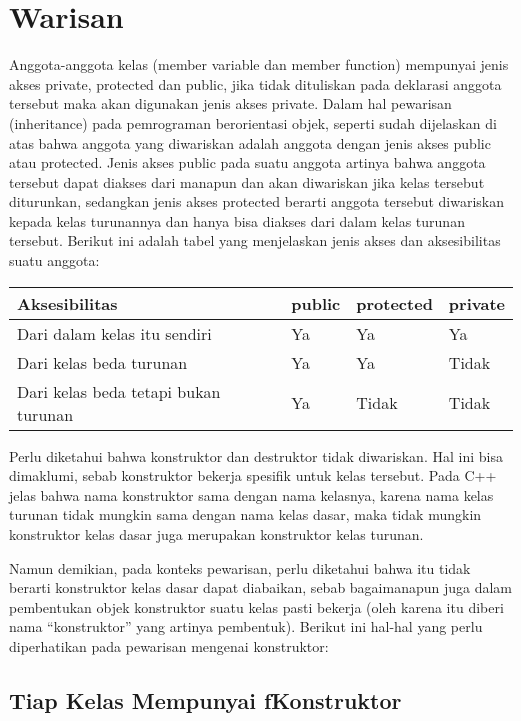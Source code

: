 \section{Warisan}\label{warisan}

Anggota-anggota kelas (member variable dan member function) mempunyai
jenis akses private, protected dan public, jika tidak dituliskan pada
deklarasi anggota tersebut maka akan digunakan jenis akses private.
Dalam hal pewarisan (inheritance) pada pemrograman berorientasi objek,
seperti sudah dijelaskan di atas bahwa anggota yang diwariskan adalah
anggota dengan jenis akses public atau protected. Jenis akses public
pada suatu anggota artinya bahwa anggota tersebut dapat diakses dari
manapun dan akan diwariskan jika kelas tersebut diturunkan, sedangkan
jenis akses protected berarti anggota tersebut diwariskan kepada kelas
turunannya dan hanya bisa diakses dari dalam kelas turunan tersebut.
Berikut ini adalah tabel yang menjelaskan jenis akses dan aksesibilitas
suatu anggota:

\begin{longtable}[]{@{}llll@{}}
\toprule
Aksesibilitas & public & protected & private\tabularnewline
\midrule
\endhead
Dari dalam kelas itu sendiri & Ya & Ya & Ya\tabularnewline
Dari kelas beda turunan & Ya & Ya & Tidak\tabularnewline
Dari kelas beda tetapi bukan turunan & Ya & Tidak & Tidak\tabularnewline
\bottomrule
\end{longtable}

Perlu diketahui bahwa konstruktor dan destruktor tidak diwariskan. Hal
ini bisa dimaklumi, sebab konstruktor bekerja spesifik untuk kelas
tersebut. Pada C++ jelas bahwa nama konstruktor sama dengan nama
kelasnya, karena nama kelas turunan tidak mungkin sama dengan nama kelas
dasar, maka tidak mungkin konstruktor kelas dasar juga merupakan
konstruktor kelas turunan.

Namun demikian, pada konteks pewarisan, perlu diketahui bahwa itu tidak
berarti konstruktor kelas dasar dapat diabaikan, sebab bagaimanapun juga
dalam pembentukan objek konstruktor suatu kelas pasti bekerja (oleh
karena itu diberi nama ``konstruktor'' yang artinya pembentuk). Berikut
ini hal-hal yang perlu diperhatikan pada pewarisan mengenai konstruktor:

\subsection{Tiap Kelas Mempunyai fKonstruktor}\label{tiap-kelas-mempunyai-konstruktor}

